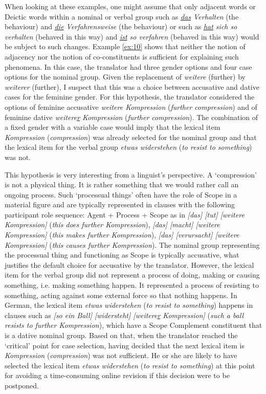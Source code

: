 When looking at these examples, one might assume that only adjacent words or Deictic words within a nominal or verbal group such as \emph{\underline{das} Verhalten} (the behaviour) and \emph{\underline{die} Verfahrensweise} (the behaviour) or such as \emph{\underline{hat} sich so verhalten} (behaved in this way) and \emph{\underline{ist} so verfahren} (behaved in this way) would be subject to such changes. Example \ref{ex:10} shows that neither the notion of adjacency nor the notion of co-constituents is sufficient for explaining such phenomena. In this case, the translator had three gender options and four case options for the nominal group. Given the replacement of \emph{weitere} (further) by \emph{weiterer} (further), I suspect that this was a choice between accusative and dative cases for the feminine gender. For this hypothesis, the translator considered the options of feminine accusative \emph{weitere Kompression} (\emph{further compression}) and of feminine dative \emph{weitere\underline{r} Kompression} (\emph{further compression}). The combination of a fixed gender with a variable case would imply that the lexical item \emph{Kompression} (\emph{compression}) was already selected for the nominal group and that the lexical item for the verbal group \emph{etwas widerstehen} (\emph{to resist to something}) was not.

This hypothesis is very interesting from a linguist's perspective. A `compression' is not a physical thing. It is rather something that we would rather call an ongoing process. Such `processual things' often have the role of Scope in a material figure \citep[p. 192]{Halliday:2004fe} and are typically represented in clauses with the following participant role sequence: Agent + Process + Scope as in \emph{{[}das{]} {[}tut{]} {[}weitere Kompression{]}} (\emph{this does further Kompression}), \emph{{[}das{]} {[}macht{]} {[}weitere Kompression{]}} (\emph{this makes further Kompression}), \emph{{[}das{]} {[}verursacht{]} {[}weitere Kompression{]}} (\emph{this causes further Kompression}). The nominal group representing the processual thing and functioning as Scope is typically accusative, what justifies the default choice for accusative by the translator. However, the lexical item for the verbal group did not represent a process of doing, making or causing something, i.e. making something happen. It represented a process of resisting to something, acting against some external force so that nothing happens. In German, the lexical item \emph{etwas widerstehen} (\emph{to resist to something}) happens in clauses such as \emph{{[}so ein Ball{]} {[}widersteht{]} {[}weitere\underline{r} Kompression{]}} (\emph{such a ball resists to further Kompression}), which have a Scope Complement constituent that is a dative nominal group. Based on that, when the translator reached the `critical' point for case selection, having decided that the next lexical item is \emph{Kompression} (\emph{compression}) was not sufficient. He or she are likely to have selected the lexical item \emph{etwas widerstehen} (\emph{to resist to something}) at this point for avoiding a time-consuming online revision if this decision were to be postponed.

